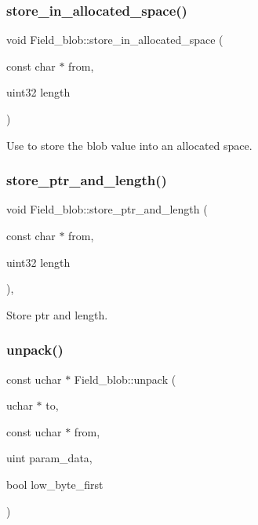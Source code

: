 \mbox{\label{classField__blob_aca7b873b7d2f2ddef55bffd625180736}} 
\subsubsection{\texorpdfstring{store\+\_\+in\+\_\+allocated\+\_\+space()}{store\_in\_allocated\_space()}}
{\footnotesize\ttfamily void Field\+\_\+blob\+::store\+\_\+in\+\_\+allocated\+\_\+space (\begin{DoxyParamCaption}\item[{const char $\ast$}]{from,  }\item[{uint32}]{length }\end{DoxyParamCaption})\hspace{0.3cm}{\ttfamily [inline]}}

Use to store the blob value into an allocated space. \mbox{\label{classField__blob_aecc1c7ac37e12b4eb8eb254795487757}} 
\subsubsection{\texorpdfstring{store\+\_\+ptr\+\_\+and\+\_\+length()}{store\_ptr\_and\_length()}}
{\footnotesize\ttfamily void Field\+\_\+blob\+::store\+\_\+ptr\+\_\+and\+\_\+length (\begin{DoxyParamCaption}\item[{const char $\ast$}]{from,  }\item[{uint32}]{length }\end{DoxyParamCaption})\hspace{0.3cm}{\ttfamily [inline]}, {\ttfamily [protected]}}

Store ptr and length. \mbox{\label{classField__blob_a1dc550d11713918f94f12abe0fd36caa}} 
\subsubsection{\texorpdfstring{unpack()}{unpack()}}
{\footnotesize\ttfamily const uchar $\ast$ Field\+\_\+blob\+::unpack (\begin{DoxyParamCaption}\item[{uchar $\ast$}]{to,  }\item[{const uchar $\ast$}]{from,  }\item[{uint}]{param\+\_\+data,  }\item[{bool}]{low\+\_\+byte\+\_\+first }\end{DoxyParamCaption})\hspace{0.3cm}{\ttfamily [virtual]}}

